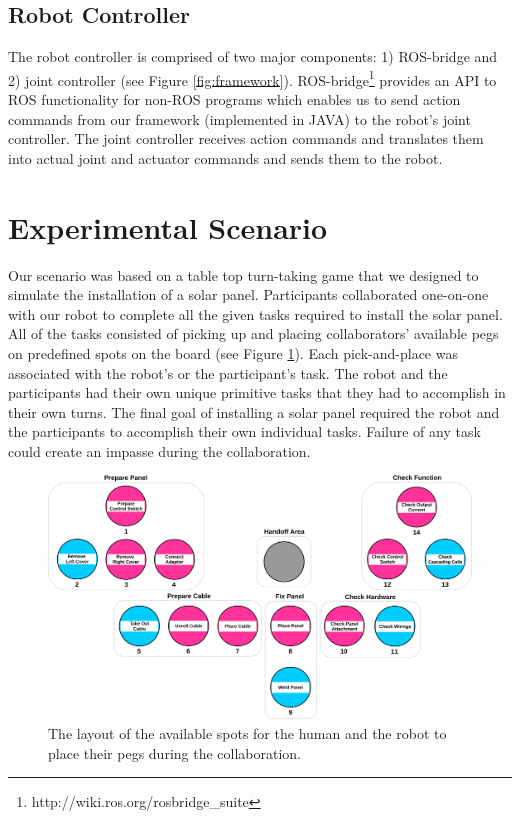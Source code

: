 \documentclass[12pt]{report}
\begin{document}
\subsection{Robot Controller}
The robot controller is comprised of two major components: 1) ROS-bridge and 2)
joint controller (see Figure \ref{fig:framework}).
ROS-bridge\footnote{http://wiki.ros.org/rosbridge\_suite} provides an API to ROS
functionality for non-ROS programs which enables us to send action commands from
our framework (implemented in JAVA) to the robot's joint controller. The joint
controller receives action commands and translates them into actual joint and
actuator commands and sends them to the robot.

\section{Experimental Scenario}

Our scenario was based on a table top turn-taking game that we designed to
simulate the installation of a solar panel. Participants collaborated one-on-one
with our robot to complete all the given tasks required to install the solar
panel. All of the tasks consisted of picking up and placing collaborators'
available pegs on predefined spots on the board (see Figure
\ref{fig:game_board}). Each pick-and-place was associated with the robot's or
the participant's task. The robot and the participants had their own unique
primitive tasks that they had to accomplish in their own turns. The final goal
of installing a solar panel required the robot and the participants to
accomplish their own individual tasks. Failure of any task could create an
impasse during the collaboration.

\begin{figure}[tbh]
  \centering
  \includegraphics[width=1\textwidth]{figure/gameBoard.pdf}
  \caption{\fontsize{10}{10}\selectfont The layout of the available spots for
  the human and the robot to place their pegs during the collaboration.}
  \label{fig:game_board}
\end{figure}
\end{document}
